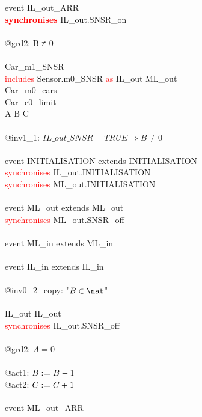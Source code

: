 \begin{description}
\begin{center}
\begin{Bcode}
			event IL_out_ARR\\
			\textcolor{red}{\textbf{synchronises}} IL_out.SNSR_on\\
			\Bwhere\\
			@grd2: B ≠ 0\\
			\Bend\\
			\Bend
			\else
			\Bmachine{} Car_m1_SNSR\\
			\textcolor{red}{includes} Sensor.m0_SNSR \textcolor{red}{as} IL_out ML_out\\
			\Brefines{} Car_m0_cars\\
			\Bsees{} Car_c0_limit\\
			\Bvariables{} A B C\\
			\Binvariants\\
			\Btab @inv1_1: \(IL\_out\_SNSR = TRUE \Rightarrow B \neq 0\)\\
			\Bevents\\
			\Btab event INITIALISATION extends INITIALISATION\\
			\Btab \textcolor{red}{synchronises} IL_out.INITIALISATION\\
            \Btab \textcolor{red}{synchronises} ML_out.INITIALISATION\\
			\Btab \Bend\\
			\Btab event ML_out extends ML_out\\
			\Btab \textcolor{red}{synchronises} ML_out.SNSR_off\\
			\Btab \Bend\\
			\Btab event ML_in extends ML_in\\
			\Btab \Bend\\
			\Btab event IL_in extends IL_in\\
			\Btab \Bwhere\\
			\Btab \Btab @inv0_2−copy: "\(B \in \nat\)" \Btheorem\\
			\Btab \Bend\\
			\Btab IL_out \Brefines{} IL_out\\
			\Btab \textcolor{red}{synchronises} IL_out.SNSR_off\\
			\Btab \Bwhere\\
			\Btab \Btab @grd2: \(A = 0\)\\
			\Btab \Bthen\\
			\Btab \Btab @act1: \(B \mathrel{:\mkern1mu=} B - 1\)\\
			\Btab \Btab @act2: \(C \mathrel{:\mkern1mu=} C + 1\)\\
			\Btab \Bend\\
			\Btab event ML_out_ARR\\

\end{Bcode}
\end{center}
\end{description}
